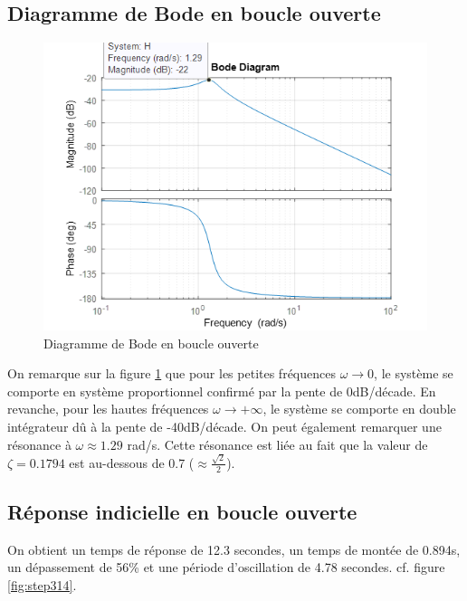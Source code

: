 \documentclass{article}
\begin{document}
\subsection{Diagramme de Bode en boucle ouverte}
\begin{figure}[h]
    \centering
    \includegraphics[width=\linewidth]{bode313.png}
    \caption{Diagramme de Bode en boucle ouverte}
    \label{fig:bode313}
\end{figure}
On remarque sur la figure \ref{fig:bode313} que pour les petites fréquences $\omega\rightarrow0$, le système se comporte en système proportionnel confirmé par la pente de 0dB/décade. En revanche, pour les hautes fréquences $\omega\rightarrow+\infty$, le système se comporte en double intégrateur dû à la pente de -40dB/décade.
On peut également remarquer une résonance à $\omega\approx1.29$ rad/s. Cette résonance est liée au fait que la valeur de $\zeta=0.1794$ est au-dessous de 0.7 ($\approx\frac{\sqrt{2}}{2}$).
\subsection{Réponse indicielle en boucle ouverte}
On obtient un temps de réponse de 12.3 secondes, un temps de montée de 0.894s, un dépassement de 56\% et une période d'oscillation de 4.78 secondes. cf. figure \ref{fig:step314}.
\end{document}
